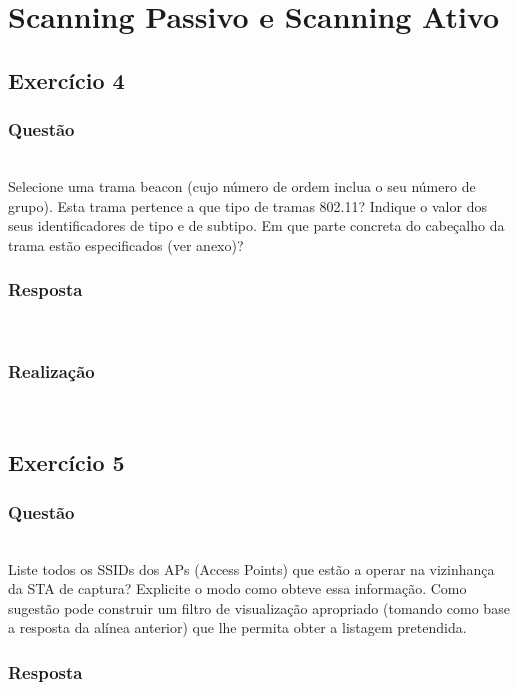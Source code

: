 \documentclass{llncs}
\begin{document}
\clearpage

\section{Scanning Passivo e Scanning Ativo}
\subsection{Exercício 4}
\subsubsection{Questão}\rule[-10pt]{0pt}{10pt}\\

Selecione uma trama beacon (cujo número de ordem inclua o seu número de grupo). Esta trama pertence a que tipo de tramas 802.11? Indique o valor dos seus identificadores de tipo e de subtipo. Em que parte concreta do cabeçalho da trama estão especificados (ver anexo)?

\subsubsection{Resposta}\rule[-10pt]{0pt}{10pt}\\



\subsubsection{Realização}\rule[-10pt]{0pt}{10pt}\\



\clearpage
\subsection{Exercício 5}
\subsubsection{Questão}\rule[-10pt]{0pt}{10pt}\\

Liste todos os SSIDs dos APs (Access Points) que estão a operar na vizinhança da STA de captura? Explicite o modo como obteve essa informação. Como sugestão pode construir um filtro de visualização apropriado (tomando como base a resposta da alínea anterior) que lhe permita obter a listagem pretendida.

\subsubsection{Resposta}\rule[-10pt]{0pt}{10pt}\\
\end{document}
